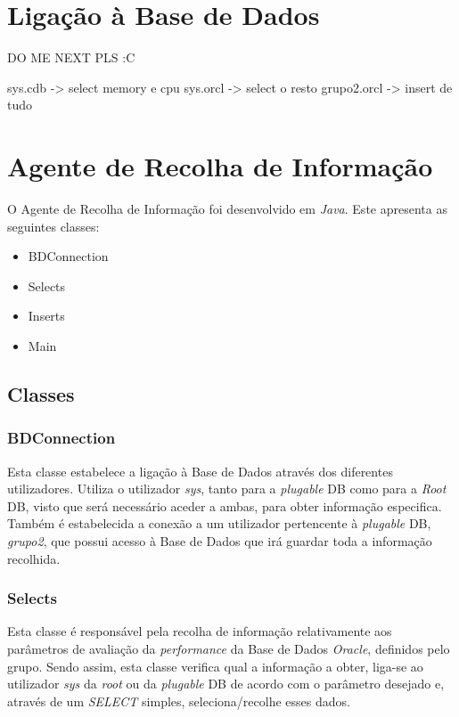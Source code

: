 \documentclass[a4paper]{article}
\begin{document}
\section{Ligação à Base de Dados}
\hspace{3mm} 

DO ME NEXT PLS :C

sys.cdb -> select memory e cpu
sys.orcl -> select o resto
grupo2.orcl -> insert de tudo

\section{Agente de Recolha de Informação}
\hspace{3mm} 

O Agente de Recolha de Informação foi desenvolvido em \emph{Java}. Este apresenta as seguintes classes:
\begin{itemize}
    \item BDConnection
    \item Selects
    \item Inserts
    \item Main
\end{itemize}

\subsection{Classes}
\hspace{3mm} 

\subsubsection{BDConnection}
\hspace{3mm} 

Esta classe estabelece a ligação à Base de Dados através dos diferentes utilizadores. Utiliza o utilizador \emph{sys}, tanto para a \emph{plugable} DB como para a \emph{Root} DB, visto que será necessário aceder a ambas, para obter informação especifica. 
Também é estabelecida a conexão a um utilizador pertencente à \emph{plugable} DB, \emph{grupo2}, que possui acesso à Base de Dados que irá guardar toda a informação recolhida.

\subsubsection{Selects}
\hspace{3mm} 

Esta classe é responsável pela recolha de informação relativamente aos parâmetros de avaliação da \emph{performance} da Base de Dados \emph{Oracle}, definidos pelo grupo. Sendo assim, esta classe verifica qual a informação a obter, liga-se ao utilizador \emph{sys} da \emph{root} ou da \emph{plugable} DB de acordo com o parâmetro desejado e, através de um \emph{SELECT} simples, seleciona/recolhe esses dados.
\end{document}
